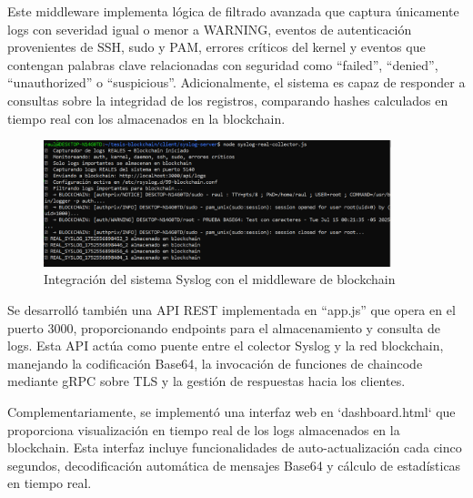 Este middleware implementa lógica de filtrado avanzada que captura únicamente logs con severidad igual o menor a WARNING, eventos de autenticación provenientes de SSH, sudo y PAM, errores críticos del kernel y eventos que contengan palabras clave relacionadas con seguridad como “failed”, “denied”, “unauthorized” o “suspicious”. Adicionalmente, el sistema es capaz de responder a consultas sobre la integridad de los registros, comparando hashes calculados en tiempo real con los almacenados en la blockchain.

\begin{figure}[H]
\centering
\includegraphics[width=0.90\textwidth]{figuras/integracion_syslog.png}
\caption{Integración del sistema Syslog con el middleware de blockchain}
\label{fig:integracion-syslog}
\end{figure}
Se desarrolló también una API REST implementada en “app.js” que opera en el puerto 3000, proporcionando endpoints para el almacenamiento y consulta de logs. Esta API actúa como puente entre el colector Syslog y la red blockchain, manejando la codificación Base64, la invocación de funciones de chaincode mediante gRPC sobre TLS y la gestión de respuestas hacia los clientes.

Complementariamente, se implementó una interfaz web en `dashboard.html` que proporciona visualización en tiempo real de los logs almacenados en la blockchain. Esta interfaz incluye funcionalidades de auto-actualización cada cinco segundos, decodificación automática de mensajes Base64 y cálculo de estadísticas en tiempo real.




